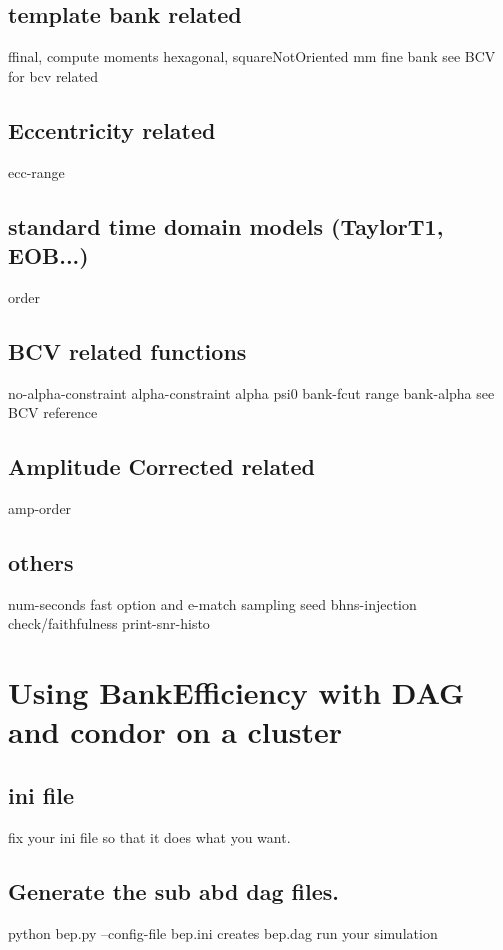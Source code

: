 \documentclass[a4paper,10pt]{article}
\begin{document}
\subsection{template bank related}
ffinal,
compute moments
hexagonal, squareNotOriented
mm 
fine bank
see BCV for bcv related
\subsection{Eccentricity related}
ecc-range
\subsection{standard time domain models (TaylorT1, EOB...)}
order
\subsection{BCV related functions}
no-alpha-constraint
alpha-constraint
alpha
psi0
bank-fcut range
bank-alpha
see BCV reference
\subsection{Amplitude Corrected related}
amp-order

\subsection{others}
num-seconds
fast option  and e-match
sampling
seed
bhns-injection
check/faithfulness
print-snr-histo

\section{Using BankEfficiency with DAG and condor on a cluster}
\subsection{ini file}
fix your ini file so that it does what you want.
\subsection{Generate the sub abd dag files.}
python bep.py --config-file bep.ini
creates bep.dag
run your simulation
\end{document}
